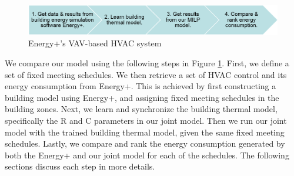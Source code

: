 \begin{figure}[t]
	\centering
		\includegraphics[width=0.9\linewidth,keepaspectratio]{./figs/app_flow.png}		
	\caption{Energy+'s VAV-based HVAC system}
	\label{fig:epflow}
\end{figure}

We compare our model using the following steps in Figure \ref{fig:epflow}. First, we define a set of fixed meeting schedules.  We then retrieve a set of HVAC control and its energy consumption from Energy+. This is achieved by first constructing a building model using Energy+, and assigning fixed meeting schedules in the building zones. Next, we learn and synchronize the building thermal model, specifically the R and C parameters in our joint model. Then we run our joint model with the trained building thermal model, given the same fixed meeting schedules. Lastly, we compare and rank the energy consumption generated by both the Energy+ and our joint model for each of the schedules. The following sections discuss each step in more details.




